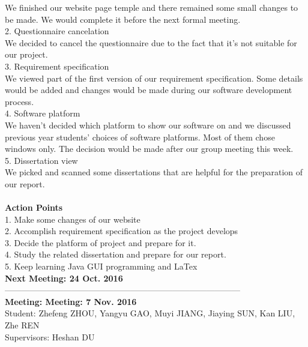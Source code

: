 \documentclass[paper=a4, fontsize=11pt,twoside]{scrartcl}		%
\begin{document}
We finished our website page temple and there remained some small changes to be made. We would complete it before the next formal meeting.\\

 
2.	Questionnaire cancelation\\

We decided to cancel the questionnaire due to the fact that it’s not suitable for our project.\\


   
3.	Requirement specification\\

We viewed part of the first version of our requirement specification. Some details would be added and changes would be made during our software development process.\\


4.	Software platform\\

We haven’t decided which platform to show our software on and we discussed previous year students’ choices of software platforms. Most of them chose windows only. The decision would be made after our group meeting this week.\\

5.	Dissertation view\\

We picked and scanned some dissertations that are helpful for the preparation of our report. \\\\

\textbf{Action Points}\\
1.	Make some changes of our website\\
2.	Accomplish requirement specification as the project develops\\
3.	Decide the platform of project and prepare for it.\\
4.	Study the related dissertation and prepare for our report.\\
5.	Keep learning Java GUI programming and LaTex\\

\textbf{Next Meeting: 24 Oct. 2016}\\
------------------------------------------------------------------------------------\\
\textbf{Meeting: Meeting: 7 Nov. 2016}\\


Student: Zhefeng ZHOU, Yangyu GAO, Muyi JIANG, Jiaying SUN, Kan LIU, Zhe REN\\
Supervisors: Heshan DU\\
\end{document}
